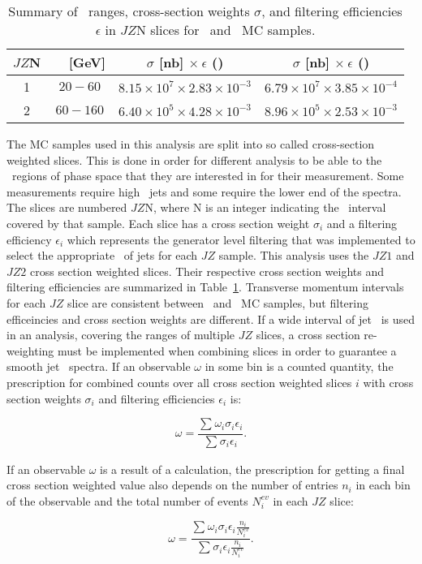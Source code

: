 \begin{table}[h]
	\centering
	\begin{tabular}{|| c | c | c | c || } 
		\hline
		$JZ$N & \RFour\ \pttruth\ [GeV] & $\sigma$ [nb] $\times\ \epsilon$ (\pp)  & $\sigma$ [nb] $\times\ \epsilon$ (\pPb) \\ 
		\hline
		1 & $20-60$ & $8.15\times 10^{7} \times 2.83\times 10^{-3}$ & $6.79\times 10^{7} \times 3.85\times 10^{-4}$ \\
		2 & $60-160$ & $6.40\times 10^{5} \times 4.28\times 10^{-3}$ & $8.96\times 10^{5} \times 2.53\times 10^{-3}$ \\
		\hline	
	\end{tabular}
	\caption{ Summary of \pt\ ranges, cross-section weights $\sigma$, and filtering efficiencies $\epsilon$ in $JZ$N slices for \pp\ and \pPb\ MC samples.  }
	\label{tab:mcweights}
\end{table}

The MC samples used in this analysis are split into so called cross-section weighted slices. This is done in order for different analysis to be able to the \pt\ regions of phase space that they are interested in for their measurement. Some measurements require high \pt\ jets and some require the lower end of the spectra. The slices are numbered $JZ$N, where N is an integer indicating the \pt\ interval covered by that sample. Each slice has a cross section weight $\sigma_{i}$ and a filtering efficiency $\epsilon_{i}$ which represents the generator level filtering that was implemented to select the  appropriate \pt\ of jets for each $JZ$ sample. This analysis uses the $JZ1$ and $JZ2$ cross section weighted slices. Their respective cross section weights and filtering efficiencies are summarized in Table~\ref{tab:mcweights}. Transverse momentum intervals for each $JZ$ slice are consistent between \pp\ and \pPb\ MC samples, but filtering efficeincies and cross section weights are different. If a wide interval of jet \pt\ is used in an analysis, covering the ranges of multiple $JZ$ slices, a cross section re-weighting must be implemented when combining slices in order to guarantee a smooth jet \pt\ spectra. If an observable $\omega$ in some bin is a counted quantity, the prescription for combined counts over all cross section weighted slices $i$ with cross section weights $\sigma_{i}$ and filtering efficiencies $\epsilon_{i}$ is:

\begin{equation}
	\omega = \frac{\sum_{}^{}\omega_{i}\sigma_{i}\epsilon_{i}}{\sum_{}^{} \sigma_{i}\epsilon_{i}}.
\end{equation}

If an observable $\omega$ is a result of a calculation, the prescription for getting a final cross section weighted value also depends on the number of entries $n_{i}$ in each bin of the observable and the total number of events $N_{i}^{ev}$ in each $JZ$ slice: 


\begin{equation}
\omega = \frac{\sum_{}^{}\omega_{i}\sigma_{i}\epsilon_{i}\frac{n_{i}}{N_{i}^{ev}}}{\sum_{}^{} \sigma_{i}\epsilon_{i}\frac{n_{i}}{N_{i}^{ev}} }.
\end{equation}


\FloatBarrier

